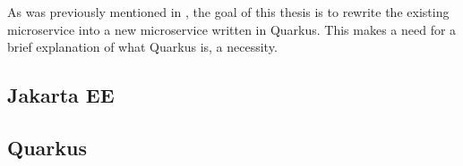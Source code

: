 \documentclass[../main.tex]{subfiles}
\begin{document}
As was previously mentioned in , the goal of this thesis is to rewrite the existing microservice into a new microservice written in Quarkus. This makes a need for a brief explanation of what Quarkus is, a necessity.

\subsection*{Jakarta EE}


\subsection*{Quarkus}

\end{document}
